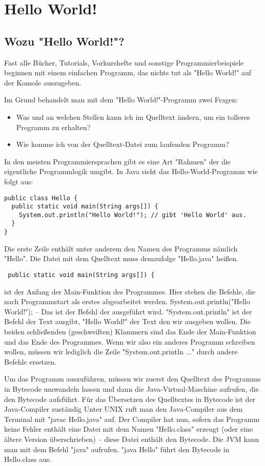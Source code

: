 \chapter {Hello World!}

\section {Wozu "Hello World!"?}

Fast alle Bücher, Tutorials, Vorkurshefte und sonstige Programmierbeispiele beginnen mit einem einfachen Programm, das nichts tut als "Hello World!" auf der Konsole auszugeben.

Im Grund behandelt man mit dem "Hello World!"-Programm zwei Fragen:
\begin{itemize}
\item Was und an welchen Stellen kann ich im Quelltext ändern, um ein tolleres Programm zu erhalten?
\item Wie komme ich von der Quelltext-Datei zum laufenden Programm?
\end{itemize}

In den meisten Programmiersprachen gibt es eine Art "Rahmen" der die eigentliche Programmlogik umgibt.
In Java sieht das Hello-World-Programm wie folgt aus: 
\begin{verbatim}
public class Hello {
  public static void main(String args[]) {
    System.out.println("Hello World!");	// gibt 'Hello World' aus.
  }
}
\end{verbatim}

Die erste Zeile enthält unter anderem den Namen des Programms nämlich "Hello". Die Datei mit dem Quelltext muss demzufolge "Hello.java" heißen.
\begin{verbatim} public static void main(String args[]) {\end{verbatim} ist der Anfang der Main-Funktion des Programmes. Hier stehen die Befehle, die nach Programmstart als erstes abgearbeitet werden.
System.out.println("Hello World!"); – Das ist der Befehl der ausgeführt wird. "System.out.println" ist der Befehl der Text ausgibt, "Hello World!" der Text den wir ausgeben wollen. 
Die beiden schließenden (geschweiften) Klammern sind das Ende der Main-Funktion und das Ende des Programmes. 
Wenn wir also ein anderes Programm schreiben wollen, müssen wir lediglich die Zeile "System.out.println ..." durch andere Befehle ersetzen.

Um das Programm auszuführen, müssen wir zuerst den Quelltext des Programms in Bytecode umwandeln lassen und dann die Java-Virtual-Maschine aufrufen, die den Bytecode aufsführt. 
Für das Übersetzen des Quelltextes in Bytecode ist der Java-Compiler zuständig
Unter UNIX ruft man den Java-Compiler aus dem Terminal mit "javac Hello.java" auf. Der Compiler hat nun, sofern das Programm keine Fehler enthält eine Datei mit dem Namen "Hello.class" erzeugt (oder eine ältere Version überschrieben) – diese Datei enthält den Bytecode.
Die JVM kann man mit dem Befehl "java" aufrufen. "java Hello" führt den Bytecode in Hello.class aus.
